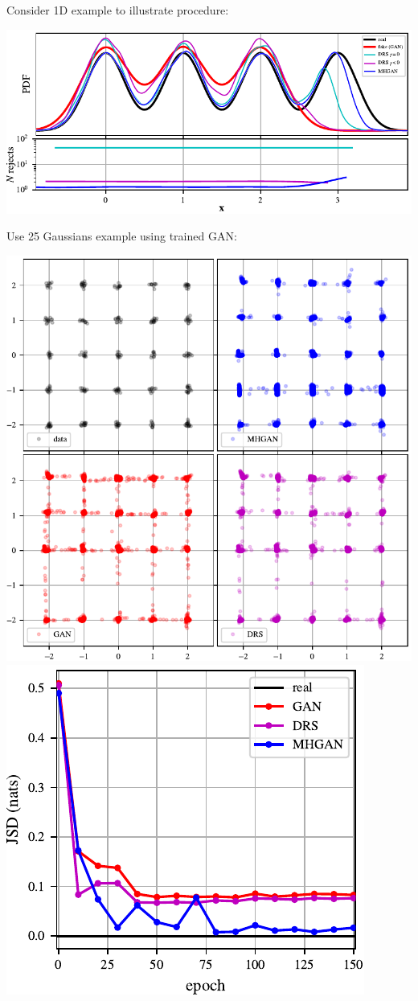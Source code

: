 \documentclass[a0,landscape]{a0poster}
\begin{document}
\begin{multicols}{3}
Consider 1D example to illustrate procedure:
\begin{center}
\includegraphics[scale=2.5]{../figures/univariate_example.pdf}
\end{center}
Use 25 Gaussians example using trained GAN:
\begin{center}
\includegraphics[scale=1.0]{../figures/mog_example_150.pdf}
\hspace{7mm}
\includegraphics[scale=2.0]{../figures/jsd.pdf}

\end{center}
\end{multicols}
\end{document}
